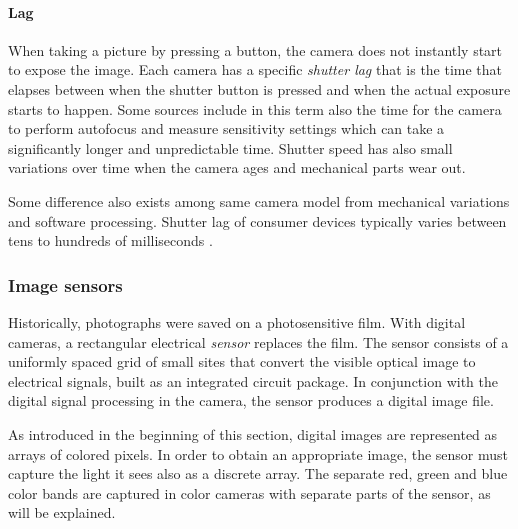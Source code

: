 


\paragraph{Lag}
When taking a picture by pressing a button, the camera does not instantly start to expose the image.
Each camera has a specific \emph{shutter lag} that is the time that elapses between when the shutter button is pressed and when the actual exposure starts to happen.
Some sources include in this term also the time for the camera to perform autofocus and measure sensitivity settings which can take a significantly longer and unpredictable time.
Shutter speed has also small variations over time when the camera ages and mechanical parts wear out.

Some difference also exists among same camera model from mechanical variations and software processing.
Shutter lag of consumer devices typically varies between tens to hundreds of milliseconds \cite{hasshutterlag}.

\subsubsection{Image sensors} \label{sec:sensors} %


Historically, photographs were saved on a photosensitive film.
With digital cameras, a rectangular electrical \emph{sensor} replaces the film.
The sensor consists of a uniformly spaced grid of small sites that convert the visible optical image to electrical signals, built as an integrated circuit package.
In conjunction with the digital signal processing in the camera, the sensor produces a digital image file.


As introduced in the beginning of this section, digital images are represented as arrays of colored pixels.
In order to obtain an appropriate image, the sensor must capture the light it sees also as a discrete array.
The separate red, green and blue color bands are captured in color cameras with separate parts of the sensor, as will be explained.

